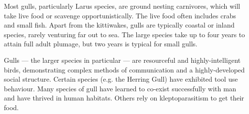 \documentclass[a4paper,12pt]{article}
\begin{document}
Most gulls, particularly Larus species, are ground nesting carnivores,
which will take live food or scavenge opportunistically. The live food
often includes crabs and small fish. Apart from the kittiwakes, gulls
are typically coastal or inland species, rarely venturing far out to sea.
The large species take up to four years to attain full adult plumage,
but two years is typical for small gulls.

Gulls — the larger species in particular — are resourceful and
highly-intelligent birds, demonstrating complex methods of communication
and a highly-developed social structure. Certain species (e.g. the
Herring Gull) have exhibited tool use behaviour. Many species of gull
have learned to co-exist successfully with man and have thrived in
human habitats. Others rely on kleptoparasitism to get their food.
\end{document}
